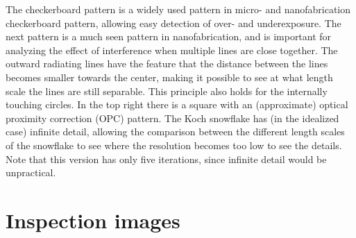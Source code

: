 The checkerboard pattern is a widely used pattern in micro- and nanofabrication checkerboard pattern, allowing easy detection of over- and underexposure. The next pattern is a much seen pattern in nanofabrication, and is important for analyzing the effect of interference when multiple lines are close together. The outward radiating lines have the feature that the distance between the lines becomes smaller towards the center, making it possible to see at what length scale the lines are still separable. This principle also holds for the internally touching circles. In the top right there is a square with an (approximate) optical proximity correction (OPC) pattern. The Koch snowflake has (in the idealized case) infinite detail, allowing the comparison between the different length scales of the snowflake to see where the resolution becomes too low to see the details. Note that this version has only five iterations, since infinite detail would be unpractical.

\section{Inspection images}\label{ap:inspec_img}


